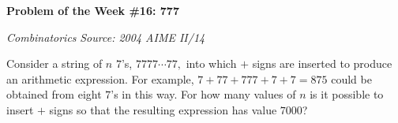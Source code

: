 \begin{potw}\vspace{5pt}
{\large\textbf{Problem of the Week \#16: 777}}\vspace{5pt}

\textit{Combinatorics}\newline
\textit{Source: 2004 AIME II/14}\V

Consider a string of $n$ $7$'s, $7777\cdots77,$ into which $+$ signs are inserted to produce an arithmetic expression. For example, $7+77+777+7+7=875$ could be obtained from eight $7$'s in this way. For how many values of $n$ is it possible to insert $+$ signs so that the resulting expression has value $7000$?
\end{potw}\V
